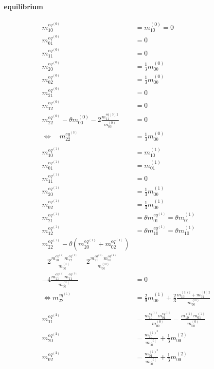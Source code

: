 \documentclass{article}
\begin{document}
  \paragraph{equilibrium}
  \begin{align}
      m_{10}^{eq^{(0)}} & = m_{10}^{(0)} = 0 \tag{Q1}
      \\
      m_{01}^{eq^{(0)}} & = 0 \tag{Q2}
      \\
      m_{11}^{eq^{(0)}} & = 0 \tag{Q3}
      \\
      m_{20}^{eq^{(0)}} & = \frac{1}{3} m_{00}^{(0)} \tag{Q4}
      \\
      m_{02}^{eq^{(0)}} & = \frac{1}{3} m_{00}^{(0)} \tag{Q5}
      \\
      m_{21}^{eq^{(0)}} & = 0 \tag{Q6}
      \\
      m_{12}^{eq^{(0)}} & = 0 \tag{Q7}
      \\
      m_{22}^{eq^{(0)}} - \theta m_{00}^{(0)} - 2\frac{ m_{11}^{eq(0)2}}{m_{00}^{(0)}} & = 0 \tag{Q8}
      \\
      \Leftrightarrow\quad m_{22}^{eq^{(0)}} & = \frac{1}{3} m_{00}^{(0)} \tag{Q9}
      \\\nonumber&\\
      m_{10}^{eq^{(1)}} & = m_{10}^{(1)}  \tag{Q10}
      \\
      m_{01}^{eq^{(1)}} & = m_{01}^{(1)}  \tag{Q11}
      \\
      m_{11}^{eq^{(1)}} & = 0  \tag{Q12}
      \\
      m_{20}^{eq^{(1)}} & = \frac{1}{3} m_{00}^{(1)}  \tag{Q13}
      \\
      m_{02}^{eq^{(1)}} & = \frac{1}{3} m_{00}^{(1)}  \tag{Q14}
      \\
      m_{21}^{eq^{(1)}} & = \theta m_{01}^{eq^{(1)}} = \theta m_{01}^{(1)} \tag{Q15}
      \\
      m_{12}^{eq^{(1)}} & = \theta m_{10}^{eq^{(1)}} = \theta m_{10}^{(1)}  \tag{Q16}
      \\
      m_{22}^{eq^{(1)}}
      - \theta (m_{20}^{eq^{(1)}} + m_{02}^{eq^{(1)}})
      &\nonumber \\
      - 2\frac{ m_{10}^{eq^{(1)}} m_{12}^{eq^{(0)}} }{m_{00}^{(0)}}
      - 2\frac{ m_{21}^{eq^{(0)}} m_{01}^{eq^{(1)}} }{m_{00}^{(0)}}
      &\nonumber \\
      - 4\frac{ m_{11}^{eq^{(1)}} m_{11}^{eq^{(0)}} }{m_{00}^{(0)}} & = 0 \tag{Q17}
      \\
      \Leftrightarrow m_{22}^{eq^{(1)}} & = \frac{2}{9} m_{00}^{(1)} \tag{Q18}
      + \frac{2}{3}\frac{  m_{10}^{(1)2} +m_{01}^{(1)2} }{m_{00}^{(0)}}
      \\\nonumber&\\
      m_{11}^{eq^{(2)}} & = \frac{ m_{10}^{eq^{(1)}}m_{01}^{eq^{(1)}}}{m_{00}^{(0)}}= \frac{ m_{10}^{(1)}m_{01}^{(1)}}{m_{00}^{(0)}}  \tag{Q19}
      \\
      m_{20}^{eq^{(2)}} &= \frac{ m_{10}^{{(1)}^2}}{m_{00}^{(0)}} + \frac{1}{3} m_{00}^{(2)}  \tag{Q20}
      \\
      m_{02}^{eq^{(2)}} &= \frac{ m_{01}^{{(1)}^2}}{m_{00}^{(0)}} + \frac{1}{3} m_{00}^{(2)} \tag{Q21}
  \end{align}
\end{document}
